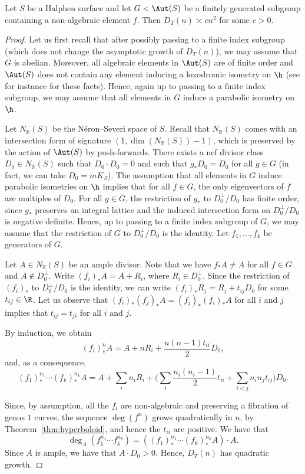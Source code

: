 \begin{lemma}\label{lem:halphen}
Let $S$ be a Halphen surface and let $G<\Aut(S)$ be a finitely generated subgroup containing a non-algebraic element $f$. Then $D_T(n)\asymp cn^2$ for some $c>0$.
\end{lemma}

\begin{proof}
Let us first recall that after possibly passing to a finite index subgroup (which does not change the asymptotic growth of $D_T(n)$), we may assume that $G$ is abelian. Moreover, all algebraic elements in $\Aut(S)$ are of finite order and $\Aut(S)$ does not contain any element inducing a loxodromic isometry on $\h$ (see for instance \cite{cantat2015cremona} for these facts). Hence, again up to passing to a finite index subgroup, we may assume that all elements in $G$ induce a parabolic isometry on~$\h$.

Let $N_{\mathbb{R}}(S)$ be the Néron--Severi space of $S$. Recall that $N_{\mathbb{R}}(S)$ comes with an intersection form of signature $(1,\dim(N_{\mathbb{R}}(S))-1)$, which is preserved by the action of $\Aut(S)$ by push-forwards. There exists a nef divisor class $D_0\in N_{\mathbb{R}}(S)$ such that $D_0\cdot D_0=0$ and such that $g_*D_0=D_0$ for all $g\in G$ (in fact, we can take $D_0=mK_S$). The assumption that all elements in $G$ induce parabolic isometries on $\h$ implies that for all $f\in G$, the only eigenvectors of $f$ are multiples of $D_0$. For all $g\in G$, the restriction of $g_*$ to $D_0^\perp/D_0$ has finite order, since $g_*$ preserves an integral lattice and the induced intersection form on $D_0^\perp/D_0$ is negative definite. Hence, up to passing to a finite index subgroup of $G$, we may assume that the restriction of $G$ to $D_0^\perp/D_0$ is the identity. Let $f_1,\dots, f_k$ be generators of $G$.

Let $A\in N_{\mathbb{R}}(S)$ be an ample divisor. Note that we have $f_*A\neq A$ for all $f\in G$ and $A\notin D_0^\perp$. Write $(f_i)_*A=A+R_i$, where $R_i\in D_0^\perp$. Since the restriction of $(f_i)_*$ to $D_0^\perp/D_0$ is the identity, we can write $(f_i)_*R_j=R_j+t_{ij}D_0$ for some $t_{ij}\in\R$. Let us observe that $(f_i)_*(f_j)_*A=(f_j)_*(f_i)_*A$ for all $i$ and $j$ implies that $t_{ij}=t_{ji}$ for all $i$ and $j$.

By induction, we obtain\vspace*{-3pt}
\[
(f_i)^n_*A=A+nR_i+\frac{n(n-1)t_{ii}}{2}D_0,
\]
and, as a consequence,\vspace*{-3pt}
\[
(f_1)^{n_1}_*\cdots (f_k)^{n_k}_*A=A+\sum_in_iR_i+\biggl(\sum_i\frac{n_i(n_i-1)}{2}t_{ii}+\sum_{i<j}n_in_jt_{ij}\biggr)D_0.
\]

Since, by assumption, all the $f_i$ are non-algebraic and preserving a fibration of genus $1$ curves, the sequence $\deg(f^n)$ grows quadratically in $n$, by Theorem~\ref{thm:hyperboloid}, and hence the $t_{ii}$ are positive. We have that
\[
\deg_A(f_1^{n_1}\cdots f_k^{n_k})=((f_1)^{n_1}_*\cdots (f_k)^{n_k}_*A)\cdot A.
\]
Since $A$ is ample, we have that $A\cdot D_0>0$. Hence, $D_T(n)$ has quadratic growth.
\end{proof}
\Changelback
